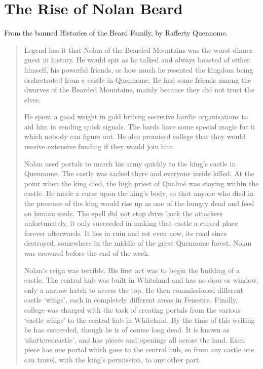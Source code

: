 \section{The Rise of Nolan Beard}
\label{nolan}

\begin{multicols}{2}

\noindent From the banned Histories of the Beard Family, by Rafferty Quennome.

\begin{quotation}

	Legend has it that Nolan of the Bearded Mountains was the worst dinner guest in history.
	He would spit as he talked and always boasted of either himself, his powerful friends, or how much he resented the kingdom being orchestrated from a castle in Quennome.
	He had some friends among the dwarves of the Bearded Mountains, mainly because they did not trust the elves.

	He spent a good weight in gold bribing secretive bardic organisations to aid him in sending quick signals.
	The bards have some special magic for it which nobody can figure out.
	He also promised \gls{college} that they would receive extensive funding if they would join him.

	Nolan used portals to march his army quickly to the king's castle in Quennome.
	The castle was sacked there and everyone inside killed.
	At the point when the king died, the high priest of Qualm\"{e} was staying within the castle.
	He made a curse upon the king's body, so that anyone who died in the presence of the king would rise up as one of the hungry dead and feed on human souls.
	The spell did not stop drive back the attackers unfortunately, it only succeeded in making that castle a cursed place forever afterwards.
	It lies in ruin and rot even now, its road since destroyed, somewhere in the middle of the great Quennome forest.
	Nolan was crowned before the end of the week.

	Nolan's reign was terrible.
	His first act was to begin the building of a castle.
	The central hub was built in Whiteland and has no door or window, only a narrow hatch to access the top.
	He then commissioned different castle `wings', each in completely different areas in Fenestra.
	Finally, \gls{college} was charged with the task of creating portals from the various `castle wings' to the central hub in Whiteland.
	By the time of this writing he has succeeded, though he is of course long dead.
	It is known as `\Gls{shatteredcastle}', and has pieces and openings all across the land.
	Each piece has one portal which goes to the central hub, so from any castle one can travel, with the king's permission, to any other part.


\end{quotation}
\end{multicols}
